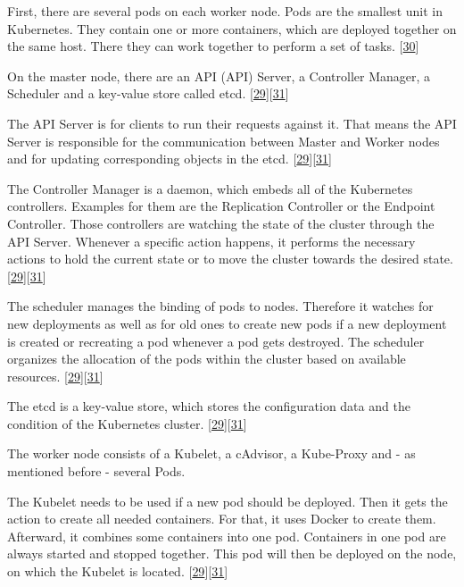 \documentclass[12pt,english,a4paper,oneside,,tablecaptionabove]{scrbook}
\begin{document}
First, there are several pods on each worker node. Pods are the smallest
unit in Kubernetes. They contain one or more containers, which are
deployed together on the same host. There they can work together to
perform a set of tasks. {[}\protect\hyperlink{ref-CoreOS}{30}{]}

On the master node, there are an \acs{API} (\acl{API}) Server, a
Controller Manager, a Scheduler and a key-value store called etcd.
{[}\protect\hyperlink{ref-Fricke}{29}{]}{[}\protect\hyperlink{ref-JorgeAcetozi}{31}{]}

The API Server is for clients to run their requests against it. That
means the API Server is responsible for the communication between Master
and Worker nodes and for updating corresponding objects in the etcd.
{[}\protect\hyperlink{ref-Fricke}{29}{]}{[}\protect\hyperlink{ref-JorgeAcetozi}{31}{]}

The Controller Manager is a daemon, which embeds all of the Kubernetes
controllers. Examples for them are the Replication Controller or the
Endpoint Controller. Those controllers are watching the state of the
cluster through the API Server. Whenever a specific action happens, it
performs the necessary actions to hold the current state or to move the
cluster towards the desired state.
{[}\protect\hyperlink{ref-Fricke}{29}{]}{[}\protect\hyperlink{ref-JorgeAcetozi}{31}{]}

The scheduler manages the binding of pods to nodes. Therefore it watches
for new deployments as well as for old ones to create new pods if a new
deployment is created or recreating a pod whenever a pod gets destroyed.
The scheduler organizes the allocation of the pods within the cluster
based on available resources.
{[}\protect\hyperlink{ref-Fricke}{29}{]}{[}\protect\hyperlink{ref-JorgeAcetozi}{31}{]}

The etcd is a key-value store, which stores the configuration data and
the condition of the Kubernetes cluster.
{[}\protect\hyperlink{ref-Fricke}{29}{]}{[}\protect\hyperlink{ref-JorgeAcetozi}{31}{]}

The worker node consists of a Kubelet, a cAdvisor, a Kube-Proxy and - as
mentioned before - several Pods.

The Kubelet needs to be used if a new pod should be deployed. Then it
gets the action to create all needed containers. For that, it uses
Docker to create them. Afterward, it combines some containers into one
pod. Containers in one pod are always started and stopped together. This
pod will then be deployed on the node, on which the Kubelet is located.
{[}\protect\hyperlink{ref-Fricke}{29}{]}{[}\protect\hyperlink{ref-JorgeAcetozi}{31}{]}
\end{document}
